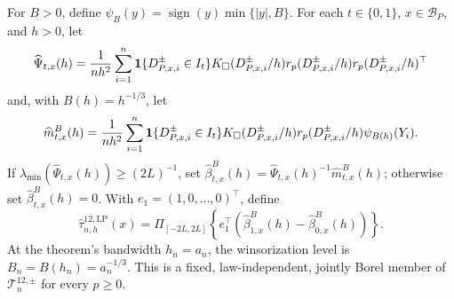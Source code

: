 For \(B>0\), define \(\psi_B(y)=\operatorname{sign}(y)\min\{|y|,B\}\).  For each \(t\in\{0,1\}\), \(x\in\mathcal B_P\), and \(h>0\), let
\[
 \widehat\Psi_{t,x}(h)={1\over nh^2}\sum_{i=1}^n
 \mathbf 1\{D^{\pm}_{P,x,i}\in I_t\}K_\square(D^{\pm}_{P,x,i}/h)
 r_p(D^{\pm}_{P,x,i}/h)r_p(D^{\pm}_{P,x,i}/h)^\top
\]
and, with \(B(h)=h^{-1/3}\), let
\[
 \widehat m^B_{t,x}(h)={1\over nh^2}\sum_{i=1}^n
 \mathbf 1\{D^{\pm}_{P,x,i}\in I_t\}K_\square(D^{\pm}_{P,x,i}/h)
 r_p(D^{\pm}_{P,x,i}/h)\psi_{B(h)}(Y_i).
\]
If \(\lambda_{\min}(\widehat\Psi_{t,x}(h))\geq(2L)^{-1}\), set \(\widehat\beta^B_{t,x}(h)=\widehat\Psi_{t,x}(h)^{-1}\widehat m^B_{t,x}(h)\); otherwise set \(\widehat\beta^B_{t,x}(h)=0\).  With \(e_1=(1,0,\ldots,0)^\top\), define
\[
 \widehat\tau^{12,\mathrm{LP}}_{n,h}(x)=
 \Pi_{[-2L,2L]}\!\left\{e_1^\top(\widehat\beta^B_{1,x}(h)-\widehat\beta^B_{0,x}(h))\right\}.
\]
At the theorem's bandwidth \(h_n=a_n\), the winsorization level is \(B_n=B(h_n)=a_n^{-1/3}\).  This is a fixed, law-independent, jointly Borel member of \(\mathcal T^{12,\pm}_n\) for every \(p\geq0\).